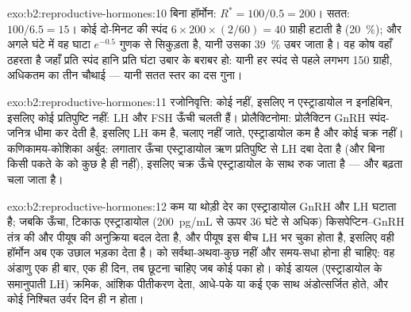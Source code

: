 \begin{solution}{exo:b2:reproductive-hormones:10}
बिना हॉर्मोन: $R^* = 100/0.5 = 200$। सतत: $100/6.5 = 15$। कोई
दो-मिनट की स्पंद $6\times 200\times(2/60) = 40$ ग्राही हटाती है
(\qty{20}{\%}); और अगले घंटे में वह घाटा
$e^{-0.5}$ गुणक से सिकुड़ता है, यानी उसका \qty{39}{\%} उबर जाता है। वह कोष
वहाँ ठहरता है जहाँ प्रति स्पंद हानि प्रति घंटा उबार के बराबर हो:
यानी हर स्पंद से पहले लगभग 150 ग्राही, अधिकतम का तीन चौथाई --- यानी
सतत स्तर का दस गुना।
\end{solution}

\begin{solution}{exo:b2:reproductive-hormones:11}
रजोनिवृत्ति: कोई  नहीं, इसलिए न एस्ट्राडायोल न इनहिबिन, इसलिए कोई
प्रतिपुष्टि नहीं: LH और FSH ऊँची चलती हैं। प्रोलैक्टिनोमा: प्रोलैक्टिन
GnRH स्पंद-जनित्र धीमा कर देती है, इसलिए LH कम है,  चलाए नहीं जाते,
एस्ट्राडायोल कम है और कोई चक्र नहीं। कणिकामय-कोशिका अर्बुद:
लगातार ऊँचा एस्ट्राडायोल ऋण प्रतिपुष्टि से LH दबा देता है (और
बिना किसी पकते  के  को कुछ है ही नहीं), इसलिए
चक्र ऊँचे एस्ट्राडायोल के साथ रुक जाता है --- और  बढ़ता चला जाता है।
\end{solution}

\begin{solution}{exo:b2:reproductive-hormones:12}
कम या थोड़ी देर का एस्ट्राडायोल GnRH और LH घटाता है; जबकि ऊँचा, टिकाऊ
एस्ट्राडायोल (\qty{200}{pg/mL} से ऊपर 36 घंटे से अधिक)
किसपेप्टिन--GnRH तंत्र की और पीयूष की अनुक्रिया बदल देता है,
और पीयूष इस बीच LH भर चुका होता है, इसलिए वही हॉर्मोन अब
एक उछाल भड़का देता है।  को सर्वथा-अथवा-कुछ नहीं और समय-सधा
होना ही चाहिए: वह अंडाणु एक ही बार, एक ही दिन, तब छूटना चाहिए जब कोई
 पका हो। कोई डायल
(एस्ट्राडायोल के समानुपाती LH) क्रमिक, आंशिक
पीतीकरण देता,  आधे-पके या कई एक साथ अंडोत्सर्जित होते,
और कोई निश्चित उर्वर दिन ही न होता।
\end{solution}


